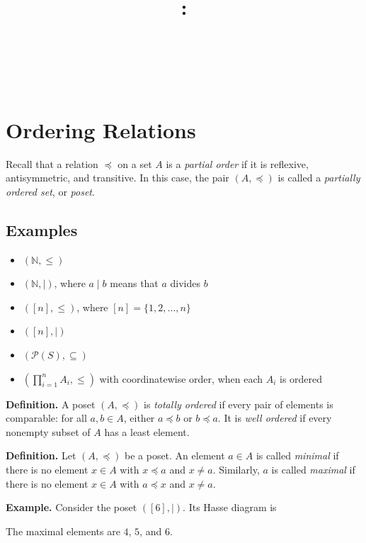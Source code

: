 \documentclass{article}
\title{
    \vspace{2in}
    \textbf{\lectClass:\\ \lectTitle}\\
    \vspace{0.1in}\large{\textit{\lectClassInstructor\ \lectSection}}
    \vspace{3in}
    \author{\textbf{\lectAuthorName}}
    \date{}
}
\begin{document}
\maketitle
\pagebreak

\section*{Ordering Relations}
Recall that a relation $\preceq$ on a set $A$ is a \textit{partial order} if it is reflexive, antisymmetric, and transitive. In this case, the pair $(A, \preceq)$ is called a \textit{partially ordered set}, or \textit{poset}.

\subsection*{Examples}

\begin{itemize}
    \item $(\mathbb{N}, \le)$
    \item $(\mathbb{N}, \mid)$, where $a \mid b$ means that $a$ divides $b$
    \item $([n], \le)$, where $[n] = \{1, 2, \dots, n\}$
    \item $([n], \mid)$
    \item $(\mathcal{P}(S), \subseteq)$
    \item $(\prod_{i = 1}^{n} A_i, \le)$ with coordinatewise order, when each $A_i$ is ordered
\end{itemize}

\textbf{Definition.} A poset $(A, \preceq)$ is \textit{totally ordered} if every pair of elements is comparable: for all $a, b \in A$, either $a \preceq b$ or $b \preceq a$. It is \textit{well ordered} if every nonempty subset of $A$ has a least element.

\textbf{Definition.} Let $(A, \preceq)$ be a poset. An element $a \in A$ is called \textit{minimal} if there is no element $x \in A$ with $x \preceq a$ and $x \ne a$. Similarly, $a$ is called \textit{maximal} if there is no element $x \in A$ with $a \preceq x$ and $x \ne a$.

\textbf{Example.} Consider the poset $([6], \mid)$. Its Hasse diagram is
\begin{center}
\end{center}
The maximal elements are $4$, $5$, and $6$.
\end{document}
